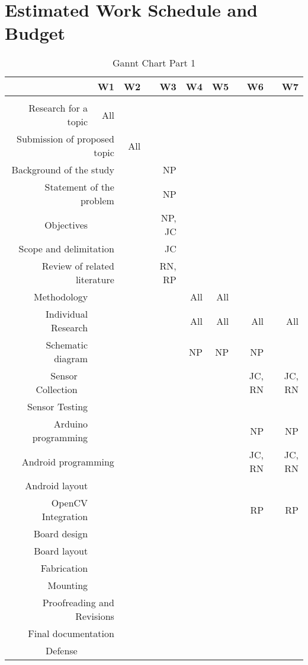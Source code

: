 \section{Estimated Work Schedule and Budget}
\begin{table}[htbp]
  \centering
  \caption{Gannt Chart Part 1}
    \begin{tabular}{rrrrrrrrr}
    \toprule
      &   & W1 & W2 & W3 & W4 & W5 & W6 & W7 \\
    \midrule
      &   &   &   &   &   &   &   &  \\
    \multicolumn{2}{r}{Research for a topic} & All &   &   &   &   &   &  \\
    \multicolumn{3}{r}{Submission of proposed topic} & All &   &   &   &   &  \\
    \multicolumn{3}{r}{Background of the study} &   & NP &   &   &   &  \\
    \multicolumn{3}{r}{Statement of the problem} &   & NP &   &   &   &  \\
    \multicolumn{2}{r}{Objectives} &   &   & NP, JC &   &   &   &  \\
    \multicolumn{3}{r}{Scope and delimitation} &   & JC &   &   &   &  \\
    \multicolumn{3}{r}{Review of related literature} &   & RN, RP &   &   &   &  \\
    \multicolumn{2}{r}{Methodology} &   &   &   & All & All &   &  \\
    \multicolumn{2}{r}{Individual Research} &   &   &   & All & All & All & All \\
    \multicolumn{2}{r}{Schematic diagram} &   &   &   & NP & NP & NP &  \\
    Sensor Collection &   &   &   &   &   &   & JC, RN & JC, RN \\
    \multicolumn{2}{r}{Sensor Testing} &   &   &   &   &   &   &  \\
    \multicolumn{2}{r}{Arduino programming} &   &   &   &   &   & NP & NP \\
    \multicolumn{3}{r}{Android programming} &   &   &   &   & JC, RN & JC, RN \\
    \multicolumn{2}{r}{Android layout} &   &   &   &   &   &   &  \\
    \multicolumn{2}{r}{OpenCV Integration} &   &   &   &   &   & RP & RP \\
    \multicolumn{2}{r}{Board design} &   &   &   &   &   &   &  \\
    \multicolumn{2}{r}{Board layout} &   &   &   &   &   &   &  \\
    \multicolumn{2}{r}{Fabrication} &   &   &   &   &   &   &  \\
    \multicolumn{2}{r}{Mounting} &   &   &   &   &   &   &  \\
    \multicolumn{3}{r}{Proofreading and Revisions} &   &   &   &   &   &  \\
    \multicolumn{3}{r}{Final documentation} &   &   &   &   &   &  \\
    Defense &   &   &   &   &   &   &   &  \\
    \bottomrule
    \end{tabular}%
  \label{tab:addlabel}%
\end{table}%
